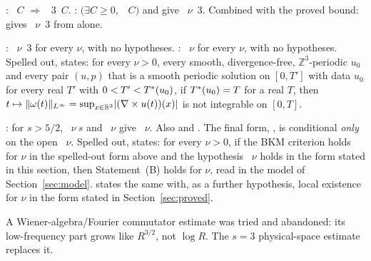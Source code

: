\documentclass[11pt]{article}
\begin{document}
\begin{proposition}
\coined: ~$C$ $\Rightarrow$ ~$3$~$C$. \coined: $(\exists C\ge0,$ ~$C$$)$ and  give ~$\nu$~3. Combined with the proved bound: \coined{} gives ~$\nu$~3 from  alone.
\end{proposition}
\begin{theorem}
\coined: ~$\nu$~3 for every $\nu$, with no hypotheses. \coined: ~$\nu$ for every $\nu$, with no hypotheses. Spelled out,  states: for every $\nu>0$, every smooth, divergence-free, $\mathbb{Z}^3$-periodic $u_0$ and every pair $(u,p)$ that is a smooth periodic solution on $[0,T']$ with data $u_0$ for every real $T'$ with $0<T'<T^{*}(u_0)$, if $T^{*}(u_0)=T$ for a real $T$, then $t\mapsto\lVert\omega(t)\rVert_{L^\infty}=\sup_{x\in\mathbb{R}^3}\lvert(\nabla\times u(t))(x)\rvert$ is not integrable on $[0,T]$.
\end{theorem}
\begin{proposition}
\coined: for $s>5/2$, ~$\nu\ s$ and ~$\nu$ give ~$\nu$. Also \coined{} and \coined. The final form, \coined, is conditional \emph{only} on the open ~$\nu$. Spelled out,  states: for every $\nu>0$, if the BKM criterion holds for $\nu$ in the spelled-out form above and the hypothesis ~$\nu$ holds in the form stated in this section, then Statement~(B) holds for $\nu$, read in the model of Section~\ref{sec:model}.  states the same with, as a further hypothesis, local existence for $\nu$ in the form stated in Section~\ref{sec:proved}.
\end{proposition}
\begin{remark}
A Wiener-algebra/Fourier commutator estimate was tried and abandoned: its low-frequency part grows like $R^{3/2}$, not $\log R$. The $s=3$ physical-space estimate replaces it.
\end{remark}
\end{document}
